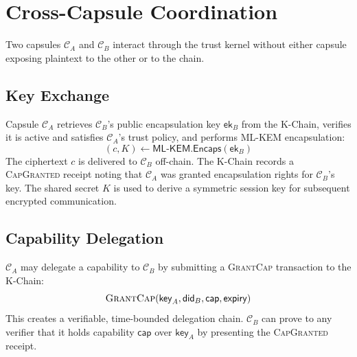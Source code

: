 

\section{Cross-Capsule Coordination}
\label{sec:cross-capsule}

Two capsules $\mathcal{C}_A$ and $\mathcal{C}_B$ interact through the trust
kernel without either capsule exposing plaintext to the other or to the chain.

\subsection{Key Exchange}

Capsule $\mathcal{C}_A$ retrieves $\mathcal{C}_B$'s public encapsulation key
$\mathsf{ek}_B$ from the K-Chain, verifies it is active and satisfies
$\mathcal{C}_A$'s trust policy, and performs ML-KEM encapsulation:
\[
    (c, K) \gets \mathsf{ML\text{-}KEM.Encaps}(\mathsf{ek}_B)
\]
The ciphertext $c$ is delivered to $\mathcal{C}_B$ off-chain. The K-Chain
records a \textsc{CapGranted} receipt noting that $\mathcal{C}_A$ was granted
encapsulation rights for $\mathcal{C}_B$'s key. The shared secret $K$ is used
to derive a symmetric session key for subsequent encrypted communication.

\subsection{Capability Delegation}

$\mathcal{C}_A$ may delegate a capability to $\mathcal{C}_B$ by submitting a
\textsc{GrantCap} transaction to the K-Chain:
\[
    \textsc{GrantCap}(\mathsf{key}_A, \mathsf{did}_B, \mathsf{cap}, \mathsf{expiry})
\]
This creates a verifiable, time-bounded delegation chain. $\mathcal{C}_B$ can
prove to any verifier that it holds capability $\mathsf{cap}$ over
$\mathsf{key}_A$ by presenting the \textsc{CapGranted} receipt.

